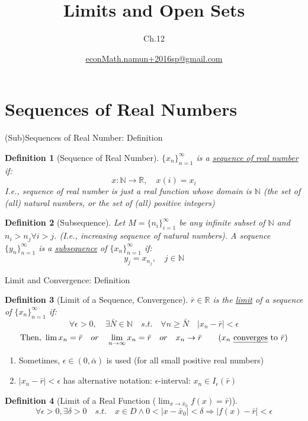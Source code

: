 \documentclass[a4paper,11pt]{article}
\author[조남운]{\url{econMath.namun+2016sp@gmail.com}}
\title{Limits and Open Sets}
\subtitle{Ch.12}
\newtheorem{defn}{Definition}
\begin{document}
	
\maketitle


\section{Sequences of Real Numbers} %
\label{sec:sequences_of_real_numbers}
\begin{frame}[t]{(Sub)Sequences of Real Number: Definition}
	\begin{defn}
		[Sequence of Real Number]
		$\{x_n\}_{n=1}^\infty$ is a \uline{sequence of real number} if:
		\[
			x:\mathbb{N}\rightarrow \mathbb{R},\quad x(i) = x_i 
		\]
		\textit{I.e.,} sequence of real number is just a real function whose domain is $\mathbb{N}$ (the set of (all) natural numbers, or the set of (all) positive integers)
	\end{defn}
	\begin{defn}
		[Subsequence]
		Let $M=\{n_i\}_{i=1}^\infty$ be any infinite subset of $\mathbb{N}$ and $n_i > n_j \forall i>j$. (\textit{I.e.}, increasing sequence of natural numbers). A sequence $\{y_n\}_{n=1}^\infty$ is a \uline{subsequence} of $\{x_n\}_{n=1}^\infty$ if:\[
			y_j = x_{n_j},\quad j\in\mathbb{N}
		\]
	\end{defn}

\end{frame}

\begin{frame}[t]{Limit and Convergence: Definition}
	\begin{defn}
		[Limit of a Sequence, Convergence]
		$\bar r\in \mathbb{R}$ is the \uline{limit} of a sequence of $\{x_n\}_{n=1}^\infty$ if:
		\[
			\forall \epsilon>0,\quad \exists \bar N\in\mathbb{N} \quad s.t.\quad \forall n\ge\bar N \quad |x_n - \bar r|<\epsilon
		\]\[
			\text{Then, } \lim x_n = \bar r \quad or\quad \lim_{n\rightarrow\infty}x_n = \bar r\quad or\quad x_n \rightarrow \bar r \tag{$x_n$ \uline{converges} to $\bar r$}
		\]
	\end{defn}
	\begin{enumerate}[Note 1:]
		\item Sometimes, $\epsilon\in(0,\bar\alpha)$ is used (for all small positive real numbers)
		\item $|x_n - \bar r|<\epsilon$ has alternative notation: $\epsilon$-interval: $x_n \in I_\epsilon(\bar r )$
	\end{enumerate}
	\begin{defn}
		[Limit of a Real Function ($\lim_{x\rightarrow \bar x_0} f(x)= \bar r $)]
		\[
		 \forall \epsilon>0,\exists \delta>0 \quad s.t.\quad x\in D\land 0<|x-\bar x_0 |<\delta \Rightarrow  |f(x)-\bar r |<\epsilon
		\]
	\end{defn}
\end{frame}
\end{document}
